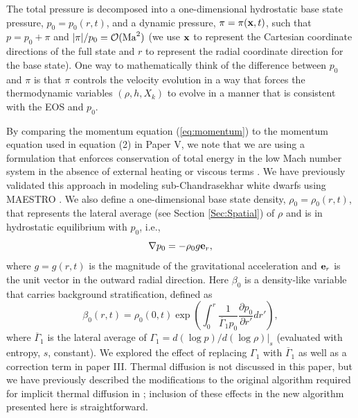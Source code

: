 \documentclass{aastex62}
\newcommand{\eb}{{\bf{e}}}
\newcommand{\xb}{{\bf{x}}}
\newcommand{\gammaonebar}{\overline{\Gamma}_1}
\begin{document}
The total pressure is decomposed into a one-dimensional hydrostatic base state
 pressure, $p_0 = p_0(r,t)$, and a dynamic pressure, $\pi = \pi(\xb,t)$, such that
$p = p_0 + \pi$ and $|\pi|/p_0 = \mathcal{O}({\rm Ma}^2)$ (we use $\xb$ to represent the Cartesian coordinate
directions of the full state and $r$ to represent the radial coordinate direction for the base state).
One way to mathematically think of the difference between $p_0$ and $\pi$ is that $\pi$ controls the velocity evolution 
in a way that forces the thermodynamic variables $(\rho,h,X_k)$ to evolve in a manner that is consistent with the EOS and $p_0$.

By comparing the momentum equation (\ref{eq:momentum}) to the momentum equation used in equation (2) in Paper V, we
note that we are using a formulation that enforces conservation of total energy in the
low Mach number system in the absence of external heating or viscous terms \citep{kleinpauluis,Vasil2013}.
We have previously validated this approach in modeling sub-Chandrasekhar white dwarfs using MAESTRO \citep{subChandra_II}.
We also define a one-dimensional base state density, $\rho_0 = \rho_0(r,t)$, that represents the lateral average (see Section \ref{Sec:Spatial}) of $\rho$ and is in hydrostatic equilibrium with $p_0$, i.e.,
\begin{equation}
\nabla p_0 = -\rho_0 g\eb_r, \label{eq:HSE}
\end{equation}
where $g=g(r,t)$ is the magnitude of the gravitational acceleration and $\eb_r$ is the unit vector in the outward radial direction.
Here $\beta_0$ is a density-like variable that carries background stratification, defined as
\begin{equation}
\beta_0(r,t) = \rho_0(0,t)\exp\left(\int_0^r\frac{1}{\gammaonebar p_0}\frac{\partial p_0}{\partial r'}dr'\right),
\end{equation}
where $\gammaonebar$ is the lateral average of $\Gamma_1 = d(\log p)/d(\log\rho) |_s$ (evaluated with entropy, $s$, constant).  We explored the effect of
replacing $\Gamma_1$ with $\gammaonebar$ as well as a correction term in paper III. 
Thermal diffusion is not discussed in this paper, but we have previously described the modifications to the original algorithm required
for implicit thermal diffusion in \cite{XRB_I}; inclusion of these effects in the new algorithm presented here is straightforward.
\end{document}
